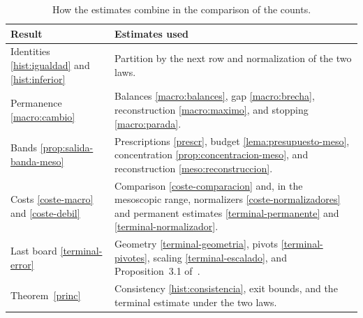 \begin{table}[htbp]
\centering\small
\caption{How the estimates combine in the comparison of the counts.}
\begin{tabular}{@{}p{.31\linewidth}p{.59\linewidth}@{}}
\toprule Result & Estimates used \\ \midrule
Identities \ref{hist:igualdad} and \ref{hist:inferior} & Partition by the next row and normalization of the
two laws.\\
Permanence \ref{macro:cambio} & Balances \ref{macro:balances}, gap \ref{macro:brecha}, reconstruction
\ref{macro:maximo}, and stopping \ref{macro:parada}.\\
Bands \ref{prop:salida-banda-meso} & Prescriptions \eqref{prescr}, budget \ref{lema:presupuesto-meso},
concentration \ref{prop:concentracion-meso}, and reconstruction \ref{meso:reconstruccion}.\\
Costs \ref{coste-macro} and \ref{coste-debil} & Comparison \ref{coste-comparacion} and, in the mesoscopic
range, normalizers \ref{coste-normalizadores} and permanent estimates
\ref{terminal-permanente} and \ref{terminal-normalizador}.\\
Last board \ref{terminal-error} & Geometry \ref{terminal-geometria}, pivots \ref{terminal-pivotes}, scaling
\ref{terminal-escalado}, and Proposition~3.1 of~\cite{dw}.\\
Theorem~\ref{princ} & Consistency \ref{hist:consistencia}, exit bounds, and the terminal estimate under the
two laws.\\ \bottomrule
\end{tabular}
\end{table}
\FloatBarrier

